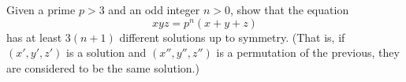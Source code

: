 Given a prime $p>3$ and an odd integer $n>0$, show that the equation $$xyz=p^n(x+y+z)$$has at least $3(n+1)$ different solutions up to symmetry. (That is, if $(x',y',z')$ is a solution and $(x'',y'',z'')$ is a permutation of the previous, they are considered to be the same solution.)